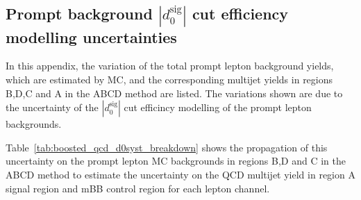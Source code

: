 \FloatBarrier
%
%
\subsection{Prompt background $|d_{0}^{\textrm{sig}}|$ cut efficiency modelling uncertainties}
\label{app:boosted_qcd_prompt_d0cut_modelling_unc}
In this appendix, the variation of the total prompt lepton background yields, which are estimated by MC,
and the corresponding multijet yields in regions B,D,C and A in the ABCD method are listed. The variations
shown are due to the uncertainty of the $|d_{0}^{\textrm{sig}}|$ cut efficincy modelling of the prompt lepton backgrounds.

Table~\ref{tab:boosted_qcd_d0syst_breakdown} shows the propagation of this uncertainty on the prompt lepton MC backgrounds
in regions B,D and C in the ABCD method to estimate the uncertainty on the QCD multijet yield in region A signal region
and mBB control region for each lepton channel.

